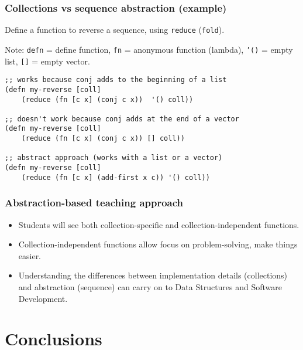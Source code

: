 \documentclass{beamer}
\newcommand{\allcomments}[1]{{#1}}
\newcommand{\joecomment}[1]{{\bf \color{JoesGold}{\allcomments{{#1}}}}}
\newcommand{\elenacomment}[1]{{\bf \textcolor{ForestGreen}{\allcomments{{#1}}}}}
\begin{document}
\begin{frame}[fragile]
\frametitle{Collections vs sequence abstraction (example)}
Define a function to reverse a sequence, using {\tt reduce}  ({\tt fold}). 

Note: {\tt defn} = define function, {\tt fn} = anonymous function (lambda),  {\tt '()} = empty list, {\tt []} = empty vector.  %
\begin{verbatim}
;; works because conj adds to the beginning of a list
(defn my-reverse [coll]
    (reduce (fn [c x] (conj c x))  '() coll)) 

;; doesn't work because conj adds at the end of a vector
(defn my-reverse [coll]
    (reduce (fn [c x] (conj c x)) [] coll)) 

;; abstract approach (works with a list or a vector)
(defn my-reverse [coll]
    (reduce (fn [c x] (add-first x c)) '() coll)) 
\end{verbatim} %
\end{frame}

\begin{frame}
\frametitle{Abstraction-based teaching approach}
\begin{itemize}
\item Students will see both collection-specific and collection-independent functions. 
\item Collection-independent functions allow focus on problem-solving, make things easier. 
\item Understanding the differences between implementation details (collections) and abstraction (sequence) can carry on to Data Structures and Software Development. %
\end{itemize}
\end{frame}

\section{Conclusions}
\end{document}
